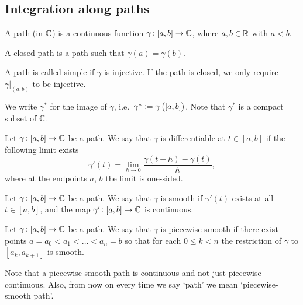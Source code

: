 \documentclass[11pt,a4paper]{article}
\begin{document}
\subsection{Integration along paths}
\begin{definition}[Path]
  A path (in $\mathbb{C}$) is a continuous function $\gamma \colon [a,b] \to \mathbb{C}$,
  where $a,b \in \mathbb{R}$ with $a < b$.
\end{definition}
\begin{definition}
  A closed path is a path such that $\gamma(a) = \gamma(b)$.
\end{definition}
\begin{definition}
  A path is called simple if $\gamma$ is injective. If the path is closed,
  we only require $\gamma\vert_{(a,b)}$ to be injective.
\end{definition}
\begin{remark}
  We write $\gamma^*$ for the image of $\gamma$, i.e.\
  $\gamma^* := \gamma\del{[a,b]}$.
  Note that $\gamma^*$ is a compact subset of $\mathbb{C}$.
\end{remark}

\begin{definition}
  Let $\gamma \colon [a, b] \to \mathbb{C}$ be a path.
  We say that $\gamma$ is differentiable at $t \in [a, b]$
  if the following limit exists
  \[
    \gamma'(t) = \lim_{h \to 0} \frac{\gamma(t + h) - \gamma(t)}{h},
  \]
  where at the endpoints $a$, $b$ the limit is one-sided.
\end{definition}

\begin{definition}
  Let $\gamma \colon [a, b] \to \mathbb{C}$ be a path.
  We say that $\gamma$ is smooth if $\gamma'(t)$ exists at all 
  $t \in [a, b]$, and the map $\gamma' \colon [a, b] \to \mathbb{C}$ is continuous.
\end{definition}

\begin{definition}
  Let $\gamma \colon [a, b] \to \mathbb{C}$ be a path.
  We say that $\gamma$ is piecewise-smooth if there exist points 
  $a = a_0 < a_1 < \dots < a_n = b$ so that
  for each $0 \le k < n$ the restriction of $\gamma$ to $[a_k, a_{k+1}]$
  is smooth.
\end{definition}

\begin{remark}
  Note that a piecewise-smooth path is continuous and not just
  piecewise continuous. Also, from now on every time we say `path' we mean
  `piecewise-smooth path'.
\end{remark}
\end{document}
